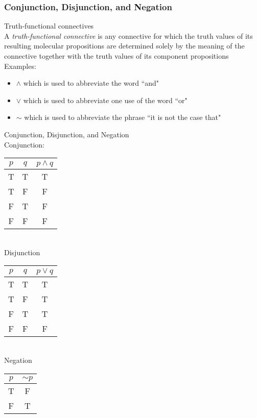 \subsubsection{Conjunction, Disjunction, and Negation}
Truth-functional connectives\\
A \textit{truth-functional connective} is any connective for which the truth values of its resulting molecular propositions are determined solely by the meaning of the connective together with the truth values of its component propositions\\
Examples:
\begin{itemize}
    \item $\wedge$ which is used to abbreviate the word ``and"
    \item $\vee$ which is used to abbreviate one use of the word ``or"
    \item $\sim$ which is used to abbreviate the phrase ``it is not the case that"
\end{itemize}

Conjunction, Disjunction, and Negation\\

Conjunction:\\
\begin{tabular}{c|c|c}
    $p$ & $q$ & $p\wedge q$\\
    \hline
    T & T & T\\
    T & F & F\\
    F & T & F\\
    F & F & F
\end{tabular}\\

Disjunction\\
\begin{tabular}{c|c|c}
    $p$ & $q$ & $p\vee q$\\
    \hline
    T & T & T\\
    T & F & T\\
    F & T & T\\
    F & F & F
\end{tabular}\\

Negation\\
\begin{tabular}{c|c}
    $p$ & $\sim p$\\
    \hline
    T & F\\
    F & T
\end{tabular}\\

